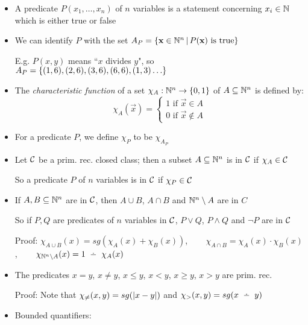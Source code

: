 \begin{itemize}
	\item A predicate $ P(x_1, \dots, x_n) $ of $ n $ variables is a statement concerning $ x_i \in \mathbb{N}$ which is either true or false
	
	\item We can identify $ P $ with the set $ A_P = \left\lbrace \mathbf{x} \in \mathbb{N}^n \, | \, P(\mathbf{x}) \text{ is true} \right\rbrace $
	
	\subitem E.g. $ P(x, y) $ means ``$ x $ divides $ y $", so $ A_P = \set{(1, 6), (2, 6), (3, 6), (6, 6), (1, 3) \dots} $
		
	\item The \textit{characteristic function} of a set $ \chi_A: \mathbb{N}^n \to \left\lbrace 0, 1 \right\rbrace $ of $ A \subseteq \mathbb{N}^n $ is defined by:
	\begin{equation*}
	\chi_A(\vec{x}) = \begin{cases}
	1 \text{ if } \vec{x} \in A\\
	0 \text{ if } \vec{x} \notin A
	\end{cases}
	\end{equation*}
	\item For a predicate $ P $, we define $ \chi_P $ to be $ \chi_{A_P} $
	
	\item Let $ \mathcal{C} $ be a prim. rec. closed class; then a subset $ A \subseteq \mathbb{N}^n $ is in $ \mathcal{C} $ if $ \chi_A \in \mathcal{C} $
	
	\subitem So a predicate $ P $ of $ n $ variables is in $ \mathcal{C} $ if $ \chi_P \in \mathcal{C} $
	
	\item If $ A, B \subseteq \mathbb{N}^n $ are in $ \mathcal{C} $, then $ A \cup B $, $ A \cap B $ and $ \mathbb{N}^n \setminus A $ are in $ C $
	
	\subitem So if $ P, Q $ are predicates of $ n $ variables in $ \mathcal{C} $, $ P \lor Q $, $ P \land Q $ and $ \lnot P $ are in $ \mathcal{C} $
	
	\subitem Proof: $ \chi_{A \cup B}(x) = sg(\chi_A(x) + \chi_B(x)) $, ~~~ $ \chi_{A \cap B} = \chi_A(x) \cdot \chi_B(x) $, ~~~ $ \chi_{\Nat^n \setminus A}(x) = 1 \monus \chi_A(x) $
	
	\item The predicates $ x = y $, $ x \ne y $, $ x \le y $, $ x < y $, $ x \ge y $, $ x > y $ are prim. rec.
	
	\subitem Proof: Note that $ \chi_{\ne} (x, y) = sg(\abs{x - y}) $ and $ \chi_{>} (x, y) = sg(x \monus y) $
	
	\item Bounded quantifiers:
	

\end{itemize}
